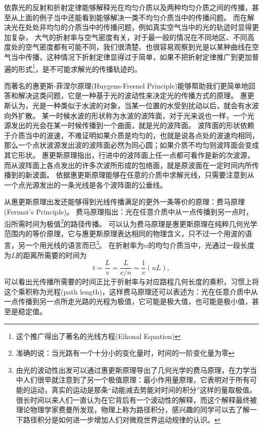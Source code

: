 依靠光的反射和折射定律能够解释光在均匀介质以及两种均匀介质之间的传播，甚至从上面的例子当中还能看到能够解决一类不均匀介质当中的传播问题。
而在解决光在处处非均匀的介质当中的传播问题，例如真实空气当中的光的轨迹时显得更加复杂，
大气的折射率与空气密度有关，对于最一般的情况在不同地区、不同高度处的空气密度都有可能不同，我们很清楚、也很容易观察到光是以某种曲线在空气当中传播，这种情况下折射定律显得过于简单，如果不把折射定律推广到更加普遍的形式\footnote{这个推广得出了著名的{\heiti 光线方程}(Eikonal Equation)}，是不可能求解光的传播轨迹的。

而著名的{\heiti 惠更斯-菲涅尔原理}(Huygens-Fresnel Principle)能够帮助我们更简单地回答和解决这类问题，它是一种基于光的波动性来决定光的传播方式的原理。
惠更斯认为，光是一种类似于水波的对象，当某一位置的水受到扰动以后，就会有水波向外扩散。
某一时候水波的形状称为水波的{\heiti 波阵面}，对于光来说也一样，一个光源发出的光会在某一时候传播到一个曲面，就是光的波阵面。
波阵面的形状依赖于介质当中的波速，不难证明如果介质是均匀的，也就是说各点处的波速均相同，那么一个点状波源发出波的波阵面必然为同心圆；如果介质不均匀则波阵面会变成其它形状。
惠更斯原理指出，行进中的波阵面上任一点都可看作是新的次波源，而从波阵面上各点发出的许多次波所形成的包络面，就是原波面在一定时间内所传播到的新波面。
依据惠更斯原理能够在任意的介质中求解光线，只需要注意到从一个点光源发出的一条光线是各个波阵面的公垂线。


从惠更斯原理出发还能够得到光线传播满足的更外一条等价的原理：{\heiti 费马原理}(Fermat's Principle)。
费马原理指出：光在任意介质中从一点传播到另一点时，沿所需时间为极值\footnote{准确的说：当光路有一个十分小的变化量时，时间的一阶变化量为零}的路径传播。
可以认为费马原理是惠更斯原理在纯粹几何光学范围内的等价原理，它与惠更斯原理表达相同的物理含义，只不过一个用波的语言，另一个用光线的语言而已\footnote{由光的波动性出发可以通过惠更斯原理导出了几何光学的费马原理，在力学当中人们很早就注意到了另一个极值原理：最小作用量原理，它表明对于所有可能的运动，真实的运动是那条“动能减去势能对时间的积分”这样的量取极值。很长时间以来人们一直认为在它背后有一个波动性的解释，而这个解释最终被理论物理学家费曼所发现，物理上称为路径积分，感兴趣的同学可以去了解一下路径积分是如何进一步增加人们对微观世界运动规律的认识。}。
在折射率为$n$的均匀介质当中，光通过一段长度为$L$的距离所需要的时间为
\begin{equation}
t=\frac{L}{v}=\frac{L}{c/n} = \frac{1}{c}(nL),
\end{equation}
可以看出光传播所需要的时间正比于折射率与对应路程几何长度的乘积，习惯上将这个乘积称为{\heiti 光程}(path length)，这样费马原理还可以表述为：光在任意介质中从一点传播到另一点所走光路的光程为极值，它可能是极大值，也可能是极小值，甚至是稳定值。


